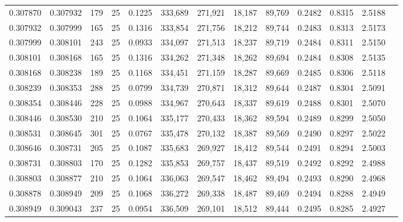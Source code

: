 \begin{tabular}{rrrrrrrrrrrrr}
0.307870 & 0.307932 &   179 &  25 &                                     0.1225 & 333,689 & 271,921 &  18,187 &  89,769 & 0.2482 & 0.8315 & 2.5188 \\
0.307932 & 0.307999 &   165 &  25 &                                     0.1316 & 333,854 & 271,756 &  18,212 &  89,744 & 0.2483 & 0.8313 & 2.5173 \\
0.307999 & 0.308101 &   243 &  25 &                                     0.0933 & 334,097 & 271,513 &  18,237 &  89,719 & 0.2484 & 0.8311 & 2.5150 \\
0.308101 & 0.308168 &   165 &  25 &                                     0.1316 & 334,262 & 271,348 &  18,262 &  89,694 & 0.2484 & 0.8308 & 2.5135 \\
0.308168 & 0.308238 &   189 &  25 &                                     0.1168 & 334,451 & 271,159 &  18,287 &  89,669 & 0.2485 & 0.8306 & 2.5118 \\
0.308239 & 0.308353 &   288 &  25 &                                     0.0799 & 334,739 & 270,871 &  18,312 &  89,644 & 0.2487 & 0.8304 & 2.5091 \\
0.308354 & 0.308446 &   228 &  25 &                                     0.0988 & 334,967 & 270,643 &  18,337 &  89,619 & 0.2488 & 0.8301 & 2.5070 \\
0.308446 & 0.308530 &   210 &  25 &                                     0.1064 & 335,177 & 270,433 &  18,362 &  89,594 & 0.2489 & 0.8299 & 2.5050 \\
0.308531 & 0.308645 &   301 &  25 &                                     0.0767 & 335,478 & 270,132 &  18,387 &  89,569 & 0.2490 & 0.8297 & 2.5022 \\
0.308646 & 0.308731 &   205 &  25 &                                     0.1087 & 335,683 & 269,927 &  18,412 &  89,544 & 0.2491 & 0.8294 & 2.5003 \\
0.308731 & 0.308803 &   170 &  25 &                                     0.1282 & 335,853 & 269,757 &  18,437 &  89,519 & 0.2492 & 0.8292 & 2.4988 \\
0.308803 & 0.308877 &   210 &  25 &                                     0.1064 & 336,063 & 269,547 &  18,462 &  89,494 & 0.2493 & 0.8290 & 2.4968 \\
0.308878 & 0.308949 &   209 &  25 &                                     0.1068 & 336,272 & 269,338 &  18,487 &  89,469 & 0.2494 & 0.8288 & 2.4949 \\
0.308949 & 0.309043 &   237 &  25 &                                     0.0954 & 336,509 & 269,101 &  18,512 &  89,444 & 0.2495 & 0.8285 & 2.4927 \\

\end{tabular}
